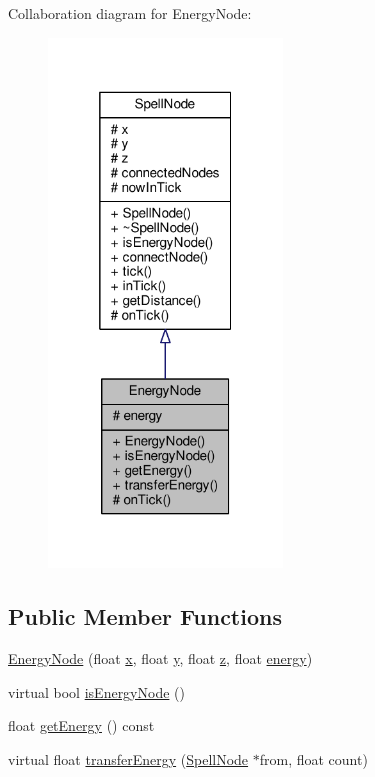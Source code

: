 Collaboration diagram for Energy\-Node\-:
\nopagebreak
\begin{figure}[H]
\begin{center}
\leavevmode
\includegraphics[width=176pt]{class_energy_node__coll__graph}
\end{center}
\end{figure}
\subsection*{Public Member Functions}
\begin{DoxyCompactItemize}
\item 
\hyperlink{class_energy_node_a607a0f6e31ff16ff882440119739ad66}{Energy\-Node} (float \hyperlink{class_spell_node_a916f2a709a674dd2a61530b6acc339cc}{x}, float \hyperlink{class_spell_node_a754d80fd0fd82dbc12443b5f277b9fb4}{y}, float \hyperlink{class_spell_node_aff090331ff1bd816a22e974a50c1a180}{z}, float \hyperlink{class_energy_node_ac2cd46828178316e24f339489f553852}{energy})
\item 
virtual bool \hyperlink{class_energy_node_a3a215be078964713e490198ee311d70f}{is\-Energy\-Node} ()
\item 
float \hyperlink{class_energy_node_aac6faa1fe6389c0f9ee63611cd322245}{get\-Energy} () const 
\item 
virtual float \hyperlink{class_energy_node_a04b3fe7a8aa49157a5c66ee8e25cfb3b}{transfer\-Energy} (\hyperlink{class_spell_node}{Spell\-Node} $\ast$from, float count)
\end{DoxyCompactItemize}
